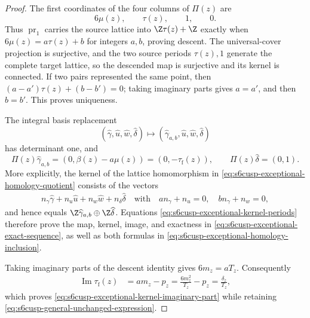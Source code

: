 \begin{proof}
The first coordinates of the four columns of \(\Pi(z)\) are
\begin{equation}\label{eq:s6cusp-first-coordinate-periods}
 6\mu(z),\qquad\tau(z),\qquad1,\qquad0.
\end{equation}
Thus \(\operatorname{pr}_1\) carries the source lattice into
\(\Z\tau(z)+\Z\) exactly when
\(6\mu(z)=a\tau(z)+b\) for integers \(a,b\), proving descent.  The
universal-cover projection is surjective, and the two source periods
\(\tau(z),1\) generate the complete target lattice, so the descended map is
surjective and its kernel is connected.  If two pairs represented the same
point, then
\((a-a')\tau(z)+(b-b')=0\); taking imaginary parts gives \(a=a'\), and
then \(b=b'\).  This proves uniqueness.

The integral basis replacement
\begin{equation}\label{eq:s6cusp-exceptional-unimodular-basis}
 (\widehat\gamma,\widehat u,\widehat w,\widehat\delta)
 \longmapsto
 (\widehat\gamma_{a,b},\widehat u,
  \widehat w,\widehat\delta)
\end{equation}
has determinant one, and
\begin{equation}\label{eq:s6cusp-exceptional-kernel-periods}
 \Pi(z)\widehat\gamma_{a,b}
 =(0,\beta(z)-a\mu(z))=(0,-\tau_{\mathrm f}(z)),
 \qquad
 \Pi(z)\widehat\delta=(0,1).
\end{equation}
More explicitly, the kernel of the lattice homomorphism in
\eqref{eq:s6cusp-exceptional-homology-quotient} consists of the vectors
\begin{align*}
 n_\gamma\widehat\gamma+n_u\widehat u
 +n_w\widehat w+n_\delta\widehat\delta
 \quad\text{with}\quad
 an_\gamma+n_u=0,
 \quad bn_\gamma+n_w=0,
\end{align*}
and hence equals
\(\Z\widehat\gamma_{a,b}\oplus\Z\widehat\delta\).
Equations \eqref{eq:s6cusp-exceptional-kernel-periods} therefore prove the
map, kernel, image, and exactness in
\eqref{eq:s6cusp-exceptional-exact-sequence}, as well as both formulas in
\eqref{eq:s6cusp-exceptional-homology-inclusion}.

Taking imaginary parts of the descent identity gives
\(6m_z=aT_z\).  Consequently
\begin{align*}
 \operatorname{Im}\tau_{\mathrm f}(z)
 &=am_z-p_z
 =\frac{6m_z^2}{T_z}-p_z
 =\frac{\delta_z}{T_z},
\end{align*}
which proves \eqref{eq:s6cusp-exceptional-kernel-imaginary-part} while
retaining \eqref{eq:s6cusp-general-unchanged-expression}.


\end{proof}

